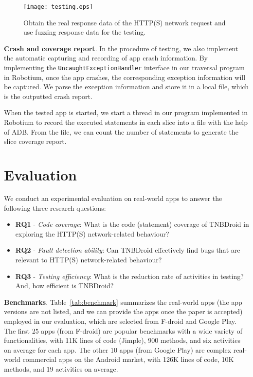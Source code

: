 \documentclass[sigconf,review, anonymous]{acmart}
\begin{document}
\begin{figure}
 \centering
  \texttt{[image: testing.eps]}
  \caption{Obtain the real response data of the HTTP(S) network request and use fuzzing response data for the testing.}
  \label{fig_testing}
\end{figure}


\textbf{Crash and coverage report}. In the procedure of testing, we also implement the automatic capturing and recording of app crash information. By implementing the \texttt{UncaughtExceptionHandler} interface in our traversal program in \textsf{Robotium}, once the app crashes, the corresponding exception information will be captured. We parse the exception information and store it in a local file, which is the outputted crash report. 

When the tested app is started, we start a thread in our   program implemented in \textsf{Robotium} to record the executed statements in each slice into a file with the help of \textsf{ADB}. From the file, we can count the number of statements to generate the slice coverage report.
 
\section{Evaluation}\label{evaluation}
We conduct an experimental evaluation on real-world apps to answer the following three research questions:

\begin{itemize}
\item {\bf RQ1} - {\it Code coverage}: What is the code (statement) coverage of \textsf{TNBDroid} in exploring the HTTP(S) network-related behaviour?
\item {\bf RQ2} - {\it Fault detection ability}: Can \textsf{TNBDroid} effectively find bugs that are relevant to HTTP(S) network-related behaviour?
\item {\bf RQ3} - {\it Testing efficiency}: What is the reduction rate of activities in testing? And, how efficient is \textsf{TNBDroid}? 
\end{itemize}


\textbf{Benchmarks}.
Table~\ref{tab:benchmark} summarizes the real-world apps (the app versions are not listed, and we can provide the apps once the paper is accepted) employed in our evaluation, which are selected from F-droid and Google Play. 
The first 25 apps (from F-droid) are popular benchmarks with a wide variety of functionalities, with 11K lines of code (Jimple), 900 methods,  and six activities on average for each app. The other 10 apps (from Google Play) are complex real-world commercial apps on the Android market, with 126K lines of code, 10K methods, and 19 activities on average.
\end{document}

